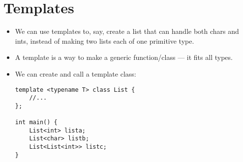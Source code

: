 \documentclass{article}
\author{Clement Tsang}
\begin{document}
\section{Templates}
\begin{itemize}
\item We can use templates to, say, create a list that can handle both chars and ints, instead of making two lists each of one primitive type.
\item A template is a way to make a generic function/class --- it fits all types.
\item We can create and call a template class:
\begin{lstlisting}
template <typename T> class List {
    //...
};

int main() {
    List<int> lista;
    List<char> listb;
    List<List<int>> listc;
}
\end{lstlisting}
\end{itemize}
\end{document}
